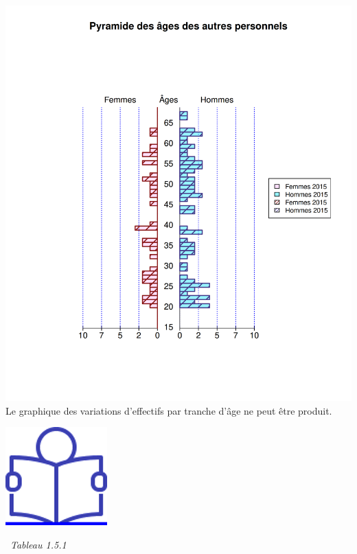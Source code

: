 \includegraphics{altair_files/figure-latex/unnamed-chunk-29-1.png}
\newpage Le graphique des variations d'effectifs par tranche d'âge ne
peut être produit.

\href{../Docs/Notices/fiche_3.odt}{\includegraphics{icones/Notice.png}}

\newpage

~\emph{Tableau 1.5.1}

